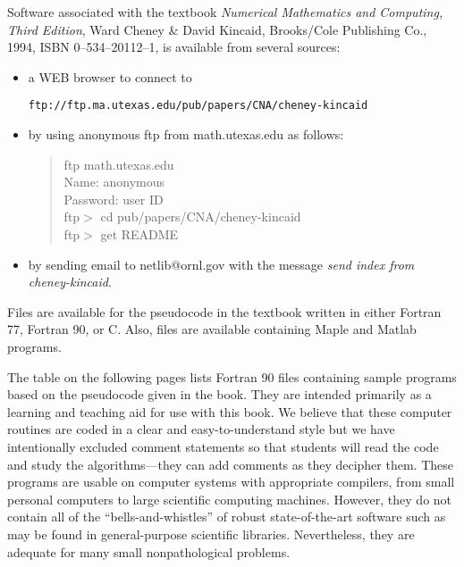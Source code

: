 \documentclass{article}
\begin{document}
Software associated with the textbook 
{\em Numerical Mathematics and Computing, Third Edition},
Ward Cheney \& David Kincaid, Brooks/Cole Publishing Co.,
1994, ISBN 0--534--20112--1, is available from several sources:

\begin{itemize}
\item
a WEB browser to connect to

{\tt ftp://ftp.ma.utexas.edu/pub/papers/CNA/cheney-kincaid}

\item
by using anonymous ftp from math.utexas.edu as follows:

\begin{verse}
ftp math.utexas.edu\\
Name: anonymous\\
Password: user ID\\
ftp$>$ cd pub/papers/CNA/cheney-kincaid\\
ftp$>$ get README 
\end{verse}

\item
 by sending email to netlib@ornl.gov
with the message {\em send index from cheney-kincaid}.
\end{itemize}

Files are available for the pseudocode in the textbook
written in either Fortran 77, Fortran 90, or C.
Also, files  are available containing Maple and Matlab programs.

The table on the following pages lists Fortran 90 
files containing sample programs 
based on the pseudocode given in the book.
They are intended  primarily as a learning and teaching aid 
for use with this book.
We believe that these computer routines are coded in a clear and
easy-to-understand style but we
have intentionally excluded comment statements 
so that students will read the code and study the algorithms---they
can add comments as they decipher them.
These programs are usable on computer systems with appropriate 
compilers, from
small personal computers to large scientific computing machines.
However, they do not contain all of the ``bells-and-whistles'' of
robust state-of-the-art software such as may be found in general-purpose
scientific libraries.
Nevertheless, they are adequate for many small nonpathological
problems.
\end{document}
